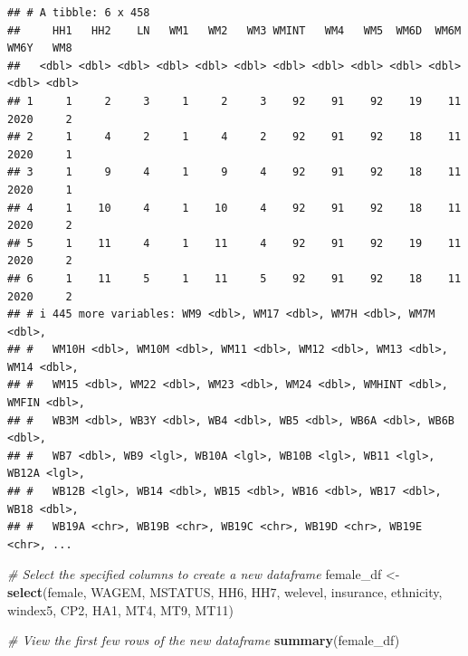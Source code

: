 \documentclass[
]{article}
\newenvironment{Shaded}{\begin{snugshade}}{\end{snugshade}}
\newcommand{\CommentTok}[1]{\textcolor[rgb]{0.56,0.35,0.01}{\textit{#1}}}
\newcommand{\FunctionTok}[1]{\textcolor[rgb]{0.13,0.29,0.53}{\textbf{#1}}}
\newcommand{\NormalTok}[1]{#1}
\newcommand{\OtherTok}[1]{\textcolor[rgb]{0.56,0.35,0.01}{#1}}
\begin{document}
\begin{verbatim}
## # A tibble: 6 x 458
##     HH1   HH2    LN   WM1   WM2   WM3 WMINT   WM4   WM5  WM6D  WM6M  WM6Y   WM8
##   <dbl> <dbl> <dbl> <dbl> <dbl> <dbl> <dbl> <dbl> <dbl> <dbl> <dbl> <dbl> <dbl>
## 1     1     2     3     1     2     3    92    91    92    19    11  2020     2
## 2     1     4     2     1     4     2    92    91    92    18    11  2020     1
## 3     1     9     4     1     9     4    92    91    92    18    11  2020     1
## 4     1    10     4     1    10     4    92    91    92    18    11  2020     2
## 5     1    11     4     1    11     4    92    91    92    19    11  2020     2
## 6     1    11     5     1    11     5    92    91    92    18    11  2020     2
## # i 445 more variables: WM9 <dbl>, WM17 <dbl>, WM7H <dbl>, WM7M <dbl>,
## #   WM10H <dbl>, WM10M <dbl>, WM11 <dbl>, WM12 <dbl>, WM13 <dbl>, WM14 <dbl>,
## #   WM15 <dbl>, WM22 <dbl>, WM23 <dbl>, WM24 <dbl>, WMHINT <dbl>, WMFIN <dbl>,
## #   WB3M <dbl>, WB3Y <dbl>, WB4 <dbl>, WB5 <dbl>, WB6A <dbl>, WB6B <dbl>,
## #   WB7 <dbl>, WB9 <lgl>, WB10A <lgl>, WB10B <lgl>, WB11 <lgl>, WB12A <lgl>,
## #   WB12B <lgl>, WB14 <dbl>, WB15 <dbl>, WB16 <dbl>, WB17 <dbl>, WB18 <dbl>,
## #   WB19A <chr>, WB19B <chr>, WB19C <chr>, WB19D <chr>, WB19E <chr>, ...
\end{verbatim}

\begin{Shaded}
\begin{Highlighting}[]
\CommentTok{\# Select the specified columns to create a new dataframe}
\NormalTok{female\_df }\OtherTok{\textless{}{-}} \FunctionTok{select}\NormalTok{(female, WAGEM, MSTATUS, HH6, HH7, welevel, insurance, ethnicity, windex5, CP2, HA1, MT4, MT9, MT11)}

\CommentTok{\# View the first few rows of the new dataframe}
\FunctionTok{summary}\NormalTok{(female\_df)}
\end{Highlighting}
\end{Shaded}
\end{document}
